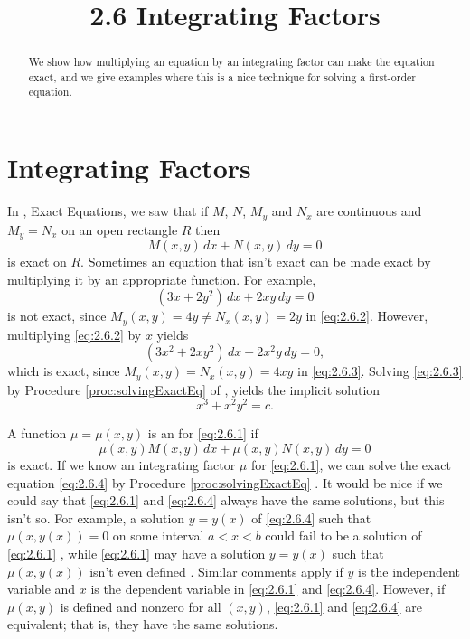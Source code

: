 \documentclass{ximera}
\title{2.6 Integrating Factors}
\begin{document}
\begin{abstract}
We show how multiplying an equation by an integrating factor can make the equation exact, and we give examples where this is a nice technique for solving a first-order equation.
\end{abstract}

\maketitle



\section*{Integrating Factors}
In , Exact Equations, we saw that if $M$, $N$, $M_y$ and $N_x$ are
continuous and $M_y=N_x$ on an open rectangle $R$ then
\begin{equation} \label{eq:2.6.1}
M(x,y)\,dx+N(x,y)\,dy=0
\end{equation}
is exact on $R$. Sometimes an equation that isn't  exact can be made
exact by multiplying it by an appropriate function. For example,
\begin{equation}\label{eq:2.6.2}
(3x+2y^2)\,dx+2xy\,dy=0
\end{equation}
is  not exact, since
$M_y(x,y)=4y\neq  N_x(x,y)=2y$ in \eqref{eq:2.6.2}.
 However, multiplying \eqref{eq:2.6.2}  by $x$ yields
\begin{equation}\label{eq:2.6.3}
(3x^2+2xy^2)\,dx+2x^2y\,dy=0,
\end{equation}
which is exact, since
$M_y(x,y)=N_x(x,y)=4xy$ in \eqref{eq:2.6.3}.
Solving \eqref{eq:2.6.3} by Procedure \ref{proc:solvingExactEq} of ,
 yields the implicit solution
$$
x^3+x^2y^2=c.
$$

A function $\mu=\mu(x,y)$ is  an  for
\eqref{eq:2.6.1}  if
\begin{equation}\label{eq:2.6.4}
 \mu(x,y)M (x,y)\,dx+\mu(x,y)N (x,y)\,dy=0
 \end{equation}
 is exact. If we know an integrating
factor $\mu$ for \eqref{eq:2.6.1}, we can solve the exact equation
\eqref{eq:2.6.4} by Procedure \ref{proc:solvingExactEq} . It would be
nice
if we could say that \eqref{eq:2.6.1} and \eqref{eq:2.6.4} always have the
same solutions, but this isn't so. For example, a solution
$y=y(x)$ of \eqref{eq:2.6.4} such that $\mu(x,y(x))=0$ on some interval
$a<x<b$ could fail to be a solution of \eqref{eq:2.6.1}
, while
\eqref{eq:2.6.1} may have a solution $y=y(x)$ such that $\mu(x,y(x)) $
isn't even defined 
. Similar comments
apply if $y$ is the independent variable and $x$ is the dependent
variable  in \eqref{eq:2.6.1} and \eqref{eq:2.6.4}.  However, if $\mu(x,y)$
is defined and nonzero for all $(x,y)$,  \eqref{eq:2.6.1}  and
\eqref{eq:2.6.4} are equivalent; that is, they have the same solutions.
\end{document}
